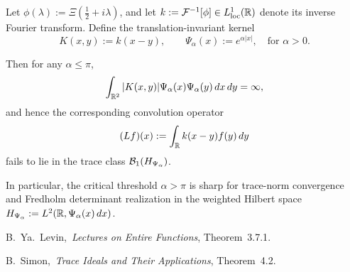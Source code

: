\begin{proposition}
\label{prop:trace_class_sharpness}
Let \( \phi(\lambda) := \Xi\left( \tfrac{1}{2} + i\lambda \right) \), and let \( k := \mathcal{F}^{-1}[\phi] \in L^1_{\mathrm{loc}}(\mathbb{R}) \) denote its inverse Fourier transform. Define the translation-invariant kernel
\[
K(x, y) := k(x - y), \qquad \Psi_\alpha(x) := e^{\alpha |x|}, \quad \text{for } \alpha > 0.
\]

Then for any \( \alpha \le \pi \),
\[
\int_{\mathbb{R}^2} |K(x, y)| \Psi_\alpha(x) \Psi_\alpha(y) \, dx \, dy = \infty,
\]
and hence the corresponding convolution operator
\[
(Lf)(x) := \int_{\mathbb{R}} k(x - y) f(y) \, dy
\]
fails to lie in the trace class \( \mathcal{B}_1(H_{\Psi_\alpha}) \).

\medskip
\noindent
In particular, the critical threshold \( \alpha > \pi \) is sharp for trace-norm convergence and Fredholm determinant realization in the weighted Hilbert space \( H_{\Psi_\alpha} := L^2(\mathbb{R}, \Psi_\alpha(x)\, dx) \).
\begin{references}
  \item B.~Ya.~Levin,\ \emph{Lectures on Entire Functions}, Theorem~3.7.1\cite{Levin1996EntireLectures}.
  \item B.~Simon,\ \emph{Trace Ideals and Their Applications}, Theorem~4.2\cite{Simon2005TraceIdeals}.
\end{references}
\end{proposition}
